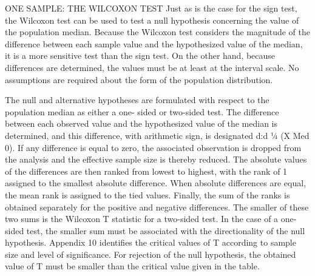 ONE SAMPLE: THE WILCOXON TEST
Just as is the case for the sign test, the Wilcoxon test can be used to test a null hypothesis concerning the
value of the population median. Because the Wilcoxon test considers the magnitude of the difference between
each sample value and the hypothesized value of the median, it is a more sensitive test than the sign test. On the
other hand, because differences are determined, the values must be at least at the interval scale. No assumptions
are required about the form of the population distribution.

The null and alternative hypotheses are formulated with respect to the population median as either a one-
sided or two-sided test. The difference between each observed value and the hypothesized value of the median
is determined, and this difference, with arithmetic sign, is designated d:d ¼ (X  Med 0). If any difference is
equal to zero, the associated observation is dropped from the analysis and the effective sample size is thereby
reduced. The absolute values of the differences are then ranked from lowest to highest, with the rank of 1
assigned to the smallest absolute difference. When absolute differences are equal, the mean rank is assigned to
the tied values. Finally, the sum of the ranks is obtained separately for the positive and negative differences. 
The
smaller of these two sums is the Wilcoxon T statistic for a two-sided test. In the case of a one-sided test, the
smaller sum must be associated with the directionality of the null hypothesis. Appendix 10 identifies the critical
values of T according to sample size and level of significance. For rejection of the null hypothesis, the obtained
value of T must be smaller than the critical value given in the table.
